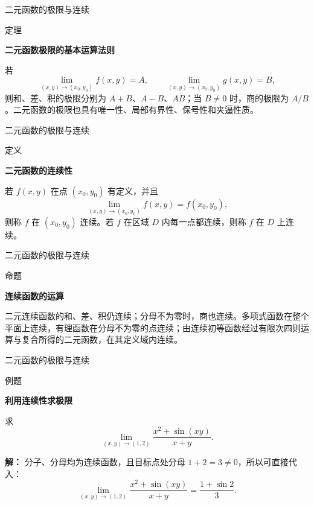 \documentclass[aspectratio=169,10pt,fontset=fandol]{ctexbeamer}
\begin{document}
\begin{frame}[t,fragile]{二元函数的极限与连续}
\normalsize
\begin{block}{定理}
{\normalsize
\textbf{二元函数极限的基本运算法则}\par

	若
	\[
	\lim_{(x,y)\to(x_0,y_0)}f(x,y)=A,\qquad
	\lim_{(x,y)\to(x_0,y_0)}g(x,y)=B,
	\]
	则和、差、积的极限分别为 \(A+B\)、\(A-B\)、\(AB\)；当 \(B\neq0\) 时，商的极限为 \(A/B\)。二元函数的极限也具有唯一性、局部有界性、保号性和夹逼性质。

}
\end{block}
\end{frame}
\begin{frame}[t,fragile]{二元函数的极限与连续}
\normalsize
\begin{block}{定义}
{\normalsize
\textbf{二元函数的连续性}\par

	若 \(f(x,y)\) 在点 \((x_0,y_0)\) 有定义，并且
	\[
	\lim_{(x,y)\to(x_0,y_0)}f(x,y)=f(x_0,y_0),
	\]
	则称 \(f\) 在 \((x_0,y_0)\) 连续。若 \(f\) 在区域 \(D\) 内每一点都连续，则称 \(f\) 在 \(D\) 上连续。

}
\end{block}
\end{frame}
\begin{frame}[t,fragile]{二元函数的极限与连续}
\normalsize
\begin{block}{命题}
{\normalsize
\textbf{连续函数的运算}\par

	二元连续函数的和、差、积仍连续；分母不为零时，商也连续。多项式函数在整个平面上连续，有理函数在分母不为零的点连续；由连续初等函数经过有限次四则运算与复合所得的二元函数，在其定义域内连续。

}
\end{block}
\end{frame}
\begin{frame}[t,fragile]{二元函数的极限与连续}
\normalsize
\begin{block}{例题}
{\normalsize
\textbf{利用连续性求极限}\par

	求
	\[
	\lim_{(x,y)\to(1,2)}
	\frac{x^2+\sin(xy)}{x+y}.
	\]

}
\end{block}
\pause
{\normalsize
\textbf{解：}
分子、分母均为连续函数，且目标点处分母 \(1+2=3\neq0\)，所以可直接代入：
	\[
	\lim_{(x,y)\to(1,2)}
	\frac{x^2+\sin(xy)}{x+y}
	=\frac{1+\sin2}{3}.
	\]

}
\end{frame}
\end{document}
